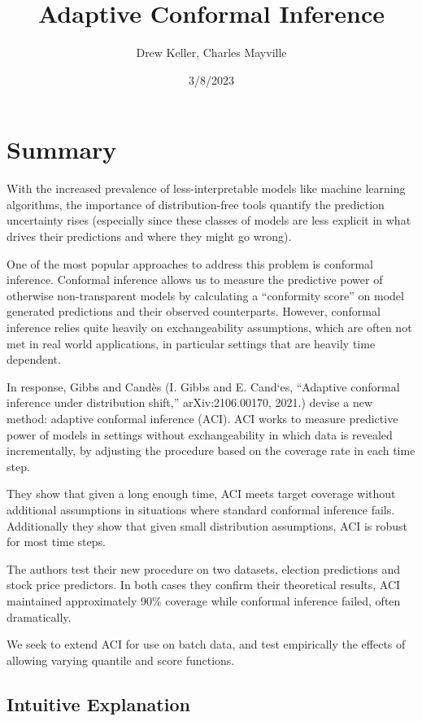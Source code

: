 \documentclass[
]{article}
\title{Adaptive Conformal Inference}
\author{Drew Keller, Charles Mayville}
\date{3/8/2023}
\begin{document}
\maketitle

\hypertarget{summary}{%
\section{Summary}\label{summary}}

With the increased prevalence of less-interpretable models like machine
learning algorithms, the importance of distribution-free tools quantify
the prediction uncertainty rises (especially since these classes of
models are less explicit in what drives their predictions and where they
might go wrong).

One of the most popular approaches to address this problem is conformal
inference. Conformal inference allows us to measure the predictive power
of otherwise non-transparent models by calculating a ``conformity
score'' on model generated predictions and their observed counterparts.
However, conformal inference relies quite heavily on exchangeability
assumptions, which are often not met in real world applications, in
particular settings that are heavily time dependent.

In response, Gibbs and Candès (I. Gibbs and E. Cand`es, ``Adaptive
conformal inference under distribution shift,'' arXiv:2106.00170, 2021.)
devise a new method: adaptive conformal inference (ACI). ACI works to
measure predictive power of models in settings without exchangeability
in which data is revealed incrementally, by adjusting the procedure
based on the coverage rate in each time step.

They show that given a long enough time, ACI meets target coverage
without additional assumptions in situations where standard conformal
inference fails. Additionally they show that given small distribution
assumptions, ACI is robust for most time steps.

The authors test their new procedure on two datasets, election
predictions and stock price predictors. In both cases they confirm their
theoretical results, ACI maintained approximately 90\% coverage while
conformal inference failed, often dramatically.

We seek to extend ACI for use on batch data, and test empirically the
effects of allowing varying quantile and score functions.

\hypertarget{intuitive-explanation}{%
\subsection{Intuitive Explanation}\label{intuitive-explanation}}
\end{document}
